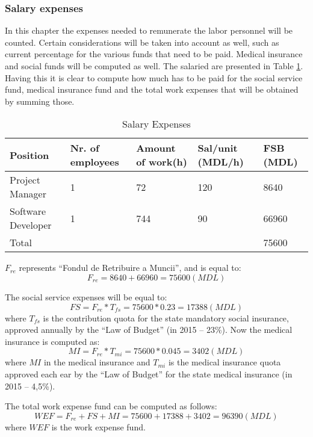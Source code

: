 \subsubsection{Salary expenses}
In this chapter the expenses needed to remunerate the labor personnel will be counted. Certain considerations will be taken into account as well, such as current percentage for the various funds that need to be paid. Medical insurance and social funds will be computed as well. The salaried are presented in Table \ref{salary_expenses}. Having this it is clear to compute how much has to be paid for the social service fund, medical insurance fund and the total work expenses that will be obtained by summing those. 


\begin{table}[ht!]
\centering
\caption{Salary Expenses}
{
\renewcommand{\arraystretch}{1.25}
\begin{tabular}{ lllll }
\hline
  Position &  Nr. of employees & Amount of work(h) & Sal/unit (MDL/h) & FSB (MDL) \\ \hline
  Project Manager & 1 & 72 & 120 & 8640 \\
  Software Developer & 1 & 744 & 90 & 66960 \\
  Total & & & & 75600 \\
\hline
\end{tabular}
}
\label{salary_expenses}
\end{table}


$F_{re}$ represents “Fondul de Retribuire a Muncii”, and is equal to: 
\begin{equation}
  F_{re} = 8640 + 66960 = 75600 (MDL) \label{4.2}
\end{equation}

The social service expenses will be equal to:
\begin{equation}
  FS = F_{re} * T_{fs} = 75600 * 0.23 = 17388 (MDL) \label{4.3}
\end{equation}
where $T_{fs}$ is the contribution quota for the state mandatory social insurance, approved annually by the “Law of Budget” (in 2015 – 23\%). Now the medical insurance is computed as:
\begin{equation}
  MI = F_{re} * T_{mi} = 75600 * 0.045 = 3402 (MDL) \label{4.4}
\end{equation}
where $MI$ in the medical insurance and $T_{mi}$ is the medical insurance quota approved each ear by the “Law of Budget” for the state medical insurance (in 2015 – 4,5\%).

The total work expense fund can be computed as follows:
\begin{equation}
  WEF = F_{re} + FS + MI = 75600 + 17388 + 3402 = 96390 (MDL) \label{4.5}
\end{equation}
where $WEF$ is the work expense fund.

